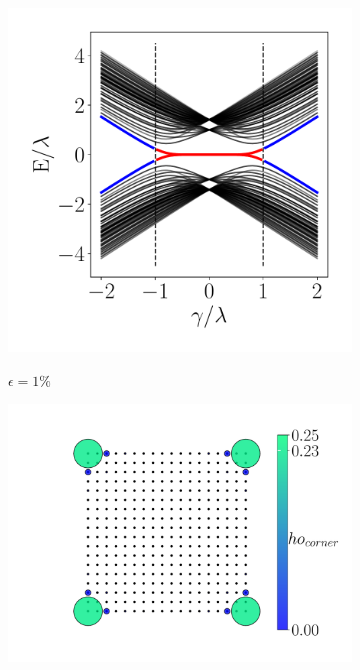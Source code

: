 
\begin{figure}[h!]
     \centering
    \captionsetup[sub]{font=small}
     \begin{minipage}[h!]{0.7\textwidth}
         \begin{subfigure}[b!]{0.44 \textwidth}
             \caption{$\epsilon = 1\%$}
             \includegraphics[width=\textwidth]{Imagenes/Resultados_Hoti_Cuadrado/bands_square_shh_0.01.pdf}
             \label{}
         \end{subfigure}\hspace*{-0.5em}
         \begin{subfigure}[b!]{0.56 \textwidth}
             \caption*{}
             \includegraphics[width=\textwidth]{Imagenes/Resultados_Hoti_Cuadrado/proyection_square_0.01.pdf}
             \label{}
         \end{subfigure}\hspace*{-0.5em}
     \end{minipage}\vspace*{-2.5em}
     

\end{figure}
